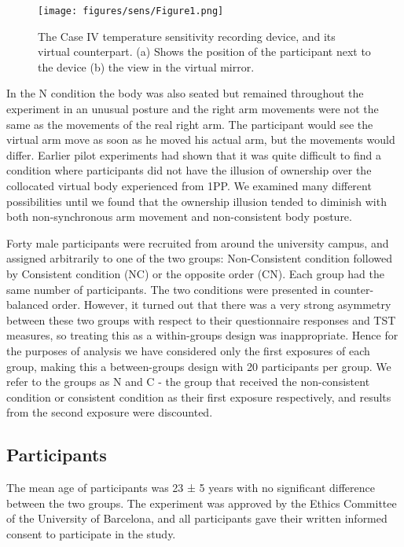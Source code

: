 \documentclass[
		twoside,openright,titlepage,numbers=noenddot,manychapters,
		headinclude,%
                footinclude=false,cleardoublepage=empty,
                BCOR=5mm,
		fontsize=11pt, %
                 enabledeprecatedfontcommands]{scrreprt}
\begin{document}
\begin{figure}[tb]

\begin{center}

\texttt{[image: figures/sens/Figure1.png]}
\caption{The Case IV temperature sensitivity recording device, and its virtual counterpart. (a) Shows the position of the participant next to the device (b) the view in the virtual mirror. }
\label{sens1}

\end{center}

\end{figure} 



In the N condition the body was also seated but remained throughout the experiment in an unusual posture and the right arm movements were not the same as the movements of the real right arm. The participant would see the virtual arm move as soon as he moved his actual arm, but the movements would differ. Earlier pilot experiments had shown that it was quite difficult to find a condition where participants did not have the illusion of ownership over the collocated virtual body experienced from 1PP. We examined many different possibilities until we found that the ownership illusion tended to diminish with both non-synchronous arm movement and non-consistent body posture.  

Forty male participants were recruited from around the university campus, and assigned arbitrarily to one of the two groups: Non-Consistent condition followed by Consistent condition (NC) or the opposite order (CN). Each group had the same number of participants.  The two conditions were presented in counter-balanced order.   However, it turned out that there was a very strong asymmetry between these two groups with respect to their questionnaire responses and TST measures, so treating this as a within-groups design was inappropriate. Hence for the purposes of analysis we have considered only the first exposures of each group, making this a between-groups design with 20 participants per group. We refer to the groups as N and C - the group that received the non-consistent condition or consistent condition as their first exposure respectively, and results from the second exposure were discounted.

\subsection{Participants}
The mean age of participants was 23 ± 5 years with no significant difference between the two groups. The experiment was approved by the Ethics Committee of the University of Barcelona, and all participants gave their written informed consent to participate in the study.
\end{document}
